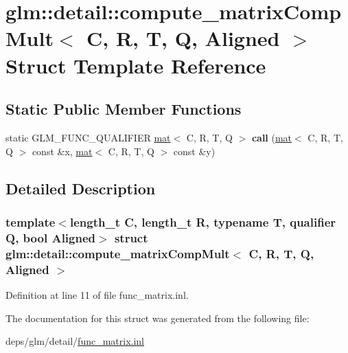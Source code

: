 \hypertarget{structglm_1_1detail_1_1compute__matrixCompMult}{}\section{glm\+:\+:detail\+:\+:compute\+\_\+matrix\+Comp\+Mult$<$ C, R, T, Q, Aligned $>$ Struct Template Reference}
\label{structglm_1_1detail_1_1compute__matrixCompMult}
\subsection*{Static Public Member Functions}
\begin{DoxyCompactItemize}
\item 
\mbox{\label{structglm_1_1detail_1_1compute__matrixCompMult_a9c27721a9eb38a6ec56d5b321c384b9a}} 
static G\+L\+M\+\_\+\+F\+U\+N\+C\+\_\+\+Q\+U\+A\+L\+I\+F\+I\+ER \hyperlink{structglm_1_1mat}{mat}$<$ C, R, T, Q $>$ {\bfseries call} (\hyperlink{structglm_1_1mat}{mat}$<$ C, R, T, Q $>$ const \&x, \hyperlink{structglm_1_1mat}{mat}$<$ C, R, T, Q $>$ const \&y)
\end{DoxyCompactItemize}


\subsection{Detailed Description}
\subsubsection*{template$<$length\+\_\+t C, length\+\_\+t R, typename T, qualifier Q, bool Aligned$>$\newline
struct glm\+::detail\+::compute\+\_\+matrix\+Comp\+Mult$<$ C, R, T, Q, Aligned $>$}



Definition at line 11 of file func\+\_\+matrix.\+inl.



The documentation for this struct was generated from the following file\+:\begin{DoxyCompactItemize}
\item 
deps/glm/detail/\hyperlink{func__matrix_8inl}{func\+\_\+matrix.\+inl}\end{DoxyCompactItemize}
